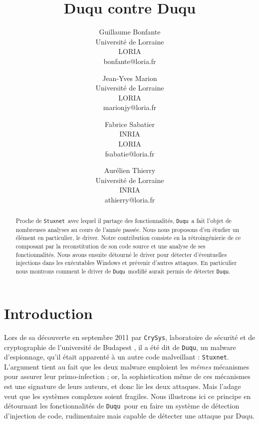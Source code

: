 \documentclass[times,11pt,fullpage]{article}
\title{Duqu contre Duqu}
\author{Guillaume Bonfante\\
\small{Universit\'e de Lorraine}\\ LORIA \\ 
bonfante@loria.fr\\
\and
Jean-Yves Marion\\
\small{Universit\'e de Lorraine}\\ LORIA \\ 
marionjy@loria.fr\\
\and
Fabrice Sabatier\\
INRIA\\
LORIA\\
fsabatie@loria.fr
\and
Aur\'elien Thierry\\
\small{Universit\'e de Lorraine}\\ INRIA \\ 
athierry@loria.fr\\
}
\newcommand{\Crysys}{\texttt{CrySys}}
\newcommand{\Duqu}{\texttt{Duqu}}
\newcommand{\Stuxnet}{\texttt{Stuxnet}}
\begin{document}
\maketitle
\thispagestyle{empty}

\begin{abstract}
Proche de \Stuxnet\ avec lequel il partage des fonctionnalités, \Duqu\ a fait l'objet de nombreuses analyses au cours de l'année passée. Nous nous proposons d'en étudier un élément en particulier, le driver. Notre contribution consiste en la rétroingénierie de ce composant par la reconstitution de son code source et une analyse de ses fonctionnalités. Nous avons ensuite détourné le driver pour détecter d'éventuelles injections dans les exécutables Windows et prévenir d'autres attaques. En particulier nous montrons comment le driver de \Duqu\ modifié aurait permis de détecter \Duqu.
\end{abstract}


\section{Introduction}

Lors de sa découverte en septembre 2011 par \Crysys, laboratoire de sécurité et de cryptographie de l'université de Budapest \cite{AThierry_CrysysDuquStuxnet}, il a été dit de \Duqu, un malware d'espionnage, qu'il était apparenté à un autre code malveillant : \Stuxnet. L'argument tient au fait que les deux malware emploient les \emph{mêmes} mécanismes pour assurer leur primo-infection ; or, la sophistication même de ces mécanismes est une signature de leurs auteurs, et donc lie les deux attaques. Mais l'adage veut que les systèmes complexes soient fragiles. Nous  illustrons ici ce principe en détournant les fonctionnalités de \Duqu\ pour en faire un système de détection d'injection de code, rudimentaire mais capable de détecter une attaque par Duqu.
\end{document}
